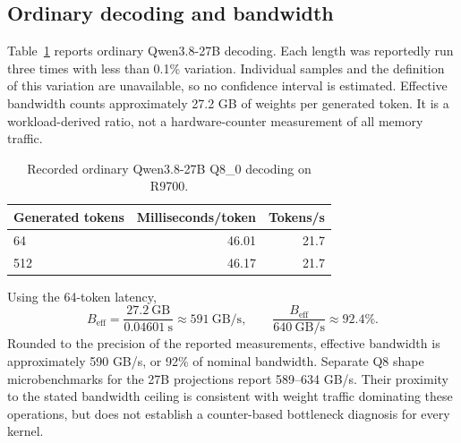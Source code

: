 \documentclass[10pt]{article}
\begin{document}
\subsection{Ordinary decoding and bandwidth}
Table~\ref{tab:ordinary} reports ordinary Qwen3.8-27B decoding. Each length was reportedly run three times with less than 0.1\% variation. Individual samples and the definition of this variation are unavailable, so no confidence interval is estimated. Effective bandwidth counts approximately 27.2 GB of weights per generated token. It is a workload-derived ratio, not a hardware-counter measurement of all memory traffic.
\begin{table}[ht]
\centering
\caption{Recorded ordinary Qwen3.8-27B Q8\_0 decoding on R9700.}
\label{tab:ordinary}
\begin{tabular}{lrr}
\toprule
Generated tokens & Milliseconds/token & Tokens/s\\
\midrule
64 & 46.01 & 21.7\\
512 & 46.17 & 21.7\\
\bottomrule
\end{tabular}
\end{table}
Using the 64-token latency,
\begin{equation}
 B_{\mathrm{eff}}=\frac{27.2\ \mathrm{GB}}{0.04601\ \mathrm{s}}
 \approx591\ \mathrm{GB/s},\qquad
 \frac{B_{\mathrm{eff}}}{640\ \mathrm{GB/s}}\approx92.4\%.
\end{equation}
Rounded to the precision of the reported measurements, effective bandwidth is approximately 590 GB/s, or 92\% of nominal bandwidth. Separate Q8 shape microbenchmarks for the 27B projections report 589--634 GB/s. Their proximity to the stated bandwidth ceiling is consistent with weight traffic dominating these operations, but does not establish a counter-based bottleneck diagnosis for every kernel.
\end{document}
